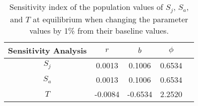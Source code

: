 \begin{table}[H]
\begin{center}
\begin{tabular}{|c|c|c|c|c|}\hline
{Sensitivity Analysis}
& $r$ & $b$ & $\phi$\\
\hline
$S_j$ &  0.0013& 0.1006 & 0.6534\\
\hline
$S_a$ & 0.0013 & 0.1006 & 0.6534\\
\hline
$T$ & -0.0084 & -0.6534 & 2.2520\\
\hline
\end{tabular}
\caption{Sensitivity index of the population values of $S_j$, $S_a$, and $T$ at equilibrium when changing the parameter values by 1\% from their baseline values.}
\label{table:NormalSensitivity}
\end{center}
\end{table}